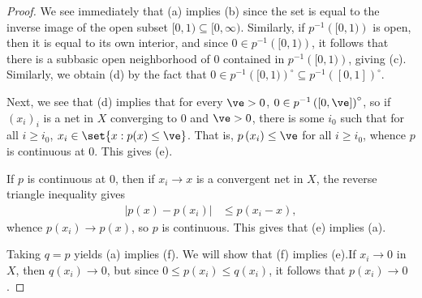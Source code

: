 \documentclass[10pt]{mypackage}
\begin{document}
\begin{proof}
  We see immediately that (a) implies (b) since the set is equal to the inverse image of the open subset $[0,1)\subseteq [0,\infty)$. Similarly, if $p^{-1}\left( [0,1) \right)$ is open, then it is equal to its own interior, and since $0\in p^{-1}\left( [0,1) \right)$, it follows that there is a subbasic open neighborhood of $0$ contained in $p^{-1}\left( [0,1) \right)$, giving (c). Similarly, we obtain (d) by the fact that $0\in p^{-1}\left( [0,1) \right)^{\circ}\subseteq p^{-1}\left( [0,1] \right)^{\circ}$.

  Next, we see that (d) implies that for every $\ve > 0$, $0\in p^{-1}\left( [0,\ve] \right)^{\circ}$, so if $\left( x_i \right)_i$ is a net in $X$ converging to $0$ and $\ve > 0$, there is some $i_0$ such that for all $i\geq i_0$, $x_i\in \set{x : p(x) \leq \ve}$. That is, $p\left( x_i \right)\leq \ve$ for all $i\geq i_0$, whence $p$ is continuous at $0$. This gives (e).

  If $p$ is continuous at $0$, then if $x_i\rightarrow x$ is a convergent net in $X$, the reverse triangle inequality gives 
  \begin{align*}
    \left\vert p\left( x \right) - p\left( x_i \right) \right\vert &\leq p\left( x_i-x \right),
  \end{align*}
  whence $p\left( x_i \right) \rightarrow p\left( x \right)$, so $p$ is continuous. This gives that (e) implies (a).

  Taking $q = p$ yields (a) implies (f). We will show that (f) implies (e).If $x_i\rightarrow 0$ in $X$, then $q\left( x_i \right)\rightarrow 0$, but since $0\leq p\left( x_i \right)\leq q\left( x_i \right)$, it follows that $p\left( x_i \right)\rightarrow 0$.
\end{proof}
\end{document}
